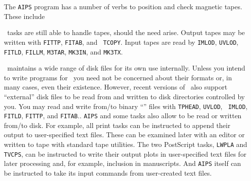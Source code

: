      The {\tt AIPS} program has a number of verbs to position and
check magnetic tapes.  These include
\btd
{}
\etd
{}

\AIPS\ tasks are still able to handle tapes, should the need arise.
Output tapes may be written with {\tt FITTP}, {\tt FITAB}, and {\tt
TCOPY}\@.  Input tapes are read by {\tt IMLOD}, {\tt UVLOD}, {\tt
FITLD}, {\tt FILLM}, {\tt M3TAR}, {\tt MK3IN}, and {\tt MK3TX}\@.


    \AIPS\ maintains a wide range of disk files for its own use
internally.  Unless you intend to write programs for \AIPS\ you need
not be concerned about their formats or, in many cases, even their
existence.  However, recent versions of \AIPS\ also support
``external'' disk files to be read from and written to disk
directories controlled by you.  You may read and write from/to binary
``'' files with {\tt TPHEAD}, {\tt UVLOD}, {\tt
IMLOD}, {\tt FITLD}, {\tt FITTP}, and {\tt FITAB}\@..  {\tt AIPS} and
some tasks also allow  to be read or written from/to
disk.  For example, all print tasks can be instructed to append their
output to user-specified text files.  These can be examined later with
an editor or written to tape with standard tape utilities.  The two
PostScript tasks, {\tt LWPLA} and {\tt TVCPS}, can be instructed to
write their output plots in user-specified text files for later
processing and, for example, inclusion in manuscripts.  And {\tt AIPS}
itself can be instructed to take its input commands from user-created
text files.

